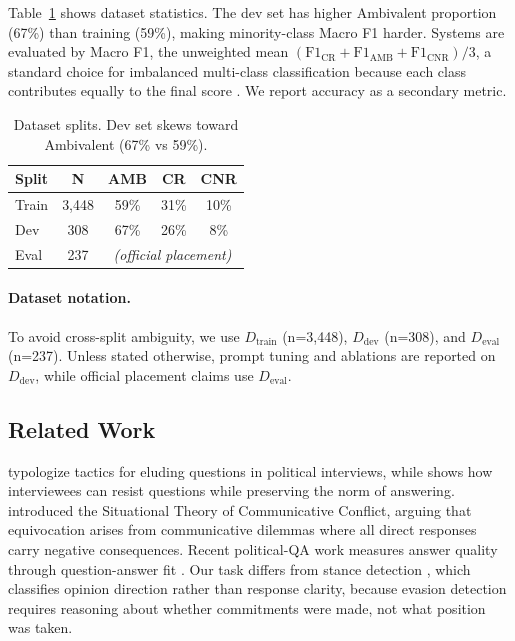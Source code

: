 \documentclass[11pt]{article}
\newcommand{\rev}[1]{#1}
\begin{document}
Table~\ref{tab:dataset} shows dataset statistics. The dev set has higher Ambivalent proportion (67\%) than training (59\%), \rev{making minority-class Macro F1 harder.} Systems are evaluated by Macro F1, \rev{the unweighted mean $(\mathrm{F1}_{\mathrm{CR}}+\mathrm{F1}_{\mathrm{AMB}}+\mathrm{F1}_{\mathrm{CNR}})/3$,} a standard choice for imbalanced multi-class classification because each class contributes equally to the final score \citep{sokolova2009systematic}. We report accuracy as a secondary metric.

\begin{table}[t]
\centering
\normalsize
\begin{tabular}{lcccc}
\toprule
\textbf{Split} & \textbf{N} & \textbf{AMB} & \textbf{CR} & \textbf{CNR} \\
\midrule
Train & 3,448 & 59\% & 31\% & 10\% \\
Dev & 308 & 67\% & 26\% & 8\% \\
Eval & 237 & \multicolumn{3}{c}{\textit{(official placement)}} \\
\bottomrule
\end{tabular}
\caption{Dataset splits. Dev set skews toward Ambivalent (67\% vs 59\%).}
\label{tab:dataset}
\end{table}

\paragraph{Dataset notation.}
To avoid cross-split ambiguity, we use $D_{\text{train}}$ (n=3,448), $D_{\text{dev}}$ (n=308), and $D_{\text{eval}}$ (n=237). Unless stated otherwise, prompt tuning and ablations are reported on $D_{\text{dev}}$, while official placement claims use $D_{\text{eval}}$.

\subsection{Related Work}

\citet{bull1993how} typologize tactics for eluding questions in political interviews, while \citet{clayman2001answers} shows how interviewees can resist questions while preserving the norm of answering. \citet{bavelas1990equivocal} introduced the Situational Theory of Communicative Conflict, arguing that equivocation arises from communicative dilemmas where all direct responses carry negative consequences. Recent political-QA work measures answer quality through question-answer fit \citep{alvarez2026answerquality}. Our task differs from stance detection \citep{mohammad2016semeval}, which classifies opinion direction rather than response clarity, because evasion detection requires reasoning about whether commitments were made, not what position was taken.
\end{document}

